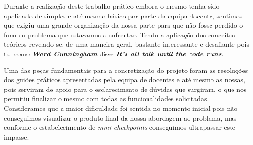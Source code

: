 \documentclass[11pt,a4paper]{report}
\begin{document}
Durante a realização deste trabalho prático embora o mesmo tenha sido apelidado de simples e até mesmo básico por parte da equipa docente, sentimos que exigiu uma grande organização da nossa parte para que não fosse perdido o foco do problema que estavamos a enfrentar. Tendo a aplicação dos conceitos teóricos revelado-se, de uma maneira geral, bastante interessante e desafiante pois tal como \emph{\textbf{Ward Cunningham}} disse \emph{\textbf{It's all talk until the code runs}}. 

Uma das peças fundamentais para a concretização do projeto foram as resoluções dos guiões práticos apresentadas pela equipa de docentes e até mesmo as nossas, pois serviram de apoio para o esclarecimento de dúvidas que surgiram, o que nos permitiu finalizar o mesmo com todas as funcionalidades solicitadas. Consideramos que a maior dificuldade foi sentida no momento inicial pois não conseguimos visualizar o produto final da nossa abordagem ao problema, mas conforme o estabelecimento de \emph{mini checkpoints} conseguimos ultrapassar este impasse.
\end{document}
